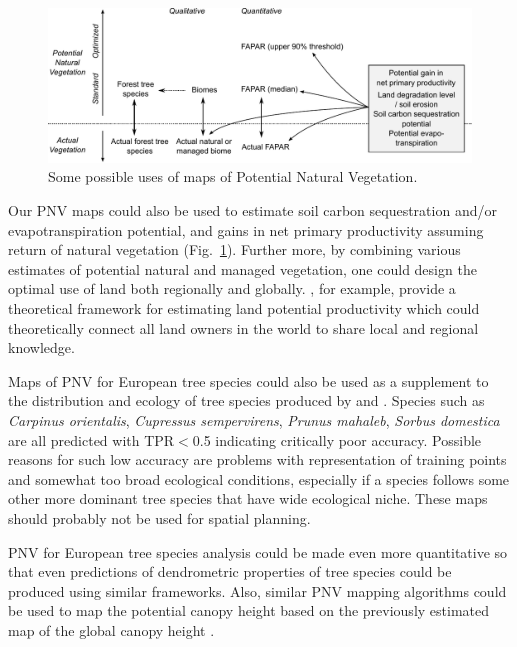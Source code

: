 \documentclass[fleqn,10pt,lineno]{wlpeerj} %
\begin{document}
\begin{figure}[!hbt]
\centering
\includegraphics[width=\linewidth]{Fig_16.pdf}
\caption{Some possible uses of maps of Potential Natural Vegetation.}
\label{Fig_scheme_PNV_land_degradation_assessment}
\end{figure}

Our PNV maps could also be used to estimate soil carbon sequestration and/or evapotranspiration potential, and gains in net primary productivity assuming return of natural vegetation (Fig.\@~\ref{Fig_scheme_PNV_land_degradation_assessment}). Further more, by combining various estimates of potential natural and managed vegetation, one could design the optimal use of land both regionally and globally. \citet{herrick2013global}, for example, provide a theoretical framework for estimating land potential productivity which could theoretically connect all land owners in the world to share local and regional knowledge.\par

Maps of PNV for European tree species could also be used as a supplement to the distribution and ecology of tree species produced by \citet{san2016european} and \citet{brus2012statistical}. Species such as \emph{Carpinus orientalis}, \emph{Cupressus sempervirens}, \emph{Prunus mahaleb}, \emph{Sorbus domestica} are all predicted with TPR$<$0.5 indicating critically poor accuracy. Possible reasons for such low accuracy are problems with representation of training points and somewhat too broad ecological conditions, especially if a species follows some other more dominant tree species that have wide ecological niche. These maps should probably not be used for spatial planning.\par 

PNV for European tree species analysis could be made even more quantitative so that even predictions of dendrometric properties of tree species could be produced using similar frameworks. Also, similar PNV mapping algorithms could be used to map the potential canopy height based on the previously estimated map of the global canopy height \citep{Simard2011}.\par
\end{document}
